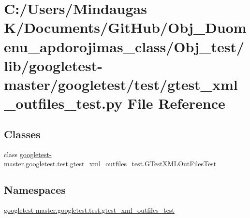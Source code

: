 \hypertarget{_obj__test_2lib_2googletest-master_2googletest_2test_2gtest__xml__outfiles__test_8py}{}\section{C\+:/\+Users/\+Mindaugas K/\+Documents/\+Git\+Hub/\+Obj\+\_\+\+Duomenu\+\_\+apdorojimas\+\_\+class/\+Obj\+\_\+test/lib/googletest-\/master/googletest/test/gtest\+\_\+xml\+\_\+outfiles\+\_\+test.py File Reference}
\label{_obj__test_2lib_2googletest-master_2googletest_2test_2gtest__xml__outfiles__test_8py}
\subsection*{Classes}
\begin{DoxyCompactItemize}
\item 
class \mbox{\hyperlink{classgoogletest-master_1_1googletest_1_1test_1_1gtest__xml__outfiles__test_1_1_g_test_x_m_l_out_files_test}{googletest-\/master.\+googletest.\+test.\+gtest\+\_\+xml\+\_\+outfiles\+\_\+test.\+G\+Test\+X\+M\+L\+Out\+Files\+Test}}
\end{DoxyCompactItemize}
\subsection*{Namespaces}
\begin{DoxyCompactItemize}
\item 
 \mbox{\hyperlink{namespacegoogletest-master_1_1googletest_1_1test_1_1gtest__xml__outfiles__test}{googletest-\/master.\+googletest.\+test.\+gtest\+\_\+xml\+\_\+outfiles\+\_\+test}}
\end{DoxyCompactItemize}

